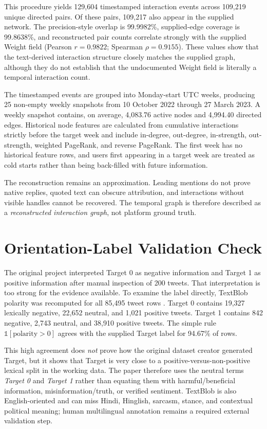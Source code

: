 \documentclass[11pt,a4paper]{article}
\begin{document}
This procedure yields 129,604 timestamped interaction events across 109,219 unique directed pairs. Of these pairs, 109,217 also appear in the supplied network. The precision-style overlap is 99.9982\%, supplied-edge coverage is 99.8638\%, and reconstructed pair counts correlate strongly with the supplied Weight field (Pearson $r=0.9822$; Spearman $\rho=0.9155$). These values show that the text-derived interaction structure closely matches the supplied graph, although they do not establish that the undocumented Weight field is literally a temporal interaction count.

The timestamped events are grouped into Monday-start UTC weeks, producing 25 non-empty weekly snapshots from 10 October 2022 through 27 March 2023. A weekly snapshot contains, on average, 4,083.76 active nodes and 4,994.40 directed edges. Historical node features are calculated from cumulative interactions strictly before the target week and include in-degree, out-degree, in-strength, out-strength, weighted PageRank, and reverse PageRank. The first week has no historical feature rows, and users first appearing in a target week are treated as cold starts rather than being back-filled with future information.

The reconstruction remains an approximation. Leading mentions do not prove native replies, quoted text can obscure attribution, and interactions without visible handles cannot be recovered. The temporal graph is therefore described as a \emph{reconstructed interaction graph}, not platform ground truth.

\section{Orientation-Label Validation Check}
The original project interpreted Target 0 as negative information and Target 1 as positive information after manual inspection of 200 tweets. That interpretation is too strong for the evidence available. To examine the label directly, TextBlob polarity was recomputed for all 85,495 tweet rows \citep{textblob}. Target 0 contains 19,327 lexically negative, 22,652 neutral, and 1,021 positive tweets. Target 1 contains 842 negative, 2,743 neutral, and 38,910 positive tweets. The simple rule $\mathbb{1}[\text{polarity}>0]$ agrees with the supplied Target label for 94.67\% of rows.

This high agreement does \emph{not} prove how the original dataset creator generated Target, but it shows that Target is very close to a positive-versus-non-positive lexical split in the working data. The paper therefore uses the neutral terms \emph{Target 0} and \emph{Target 1} rather than equating them with harmful/beneficial information, misinformation/truth, or verified sentiment. TextBlob is also English-oriented and can miss Hindi, Hinglish, sarcasm, stance, and contextual political meaning; human multilingual annotation remains a required external validation step.
\end{document}
